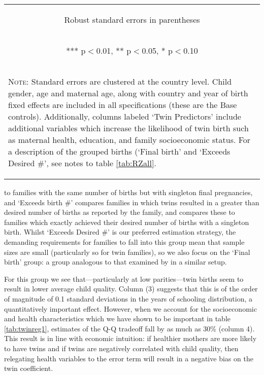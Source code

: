 \documentclass{article}[11pt,subeqn]
\begin{document}
\begin{spacing}{1.5}
\begin{sidewaystable}[!htbp]
\begin{center}
\begin{tabular}{lcccccc}
\\ \midrule													
\multicolumn{7}{c}{\begin{footnotesize} Robust standard errors in parentheses\end{footnotesize}} \\													
\multicolumn{7}{c}{\begin{footnotesize} *** p$<$0.01, ** p$<$0.05, * p$<$0.10 \end{footnotesize}} \\													
\bottomrule													
\multicolumn{7}{p{19cm}}{\setstretch{0.9}\begin{footnotesize}\textsc{Note:} Standard errors are clustered at the country level.  Child gender, age and maternal age, along with
country and year of birth fixed effects are included in all specifications (these are the Base controls). Additionally, columns labeled `Twin Predictors' include additional
variables which increase the likelihood of twin birth such as maternal health, education, and family socioeconomic status. For a description of the grouped births (`Final birth'
and `Exceeds Desired \#', see notes to table \ref{tab:RZall}. \end{footnotesize}}\\												
\end{tabular}													
\end{center}													
\end{sidewaystable}													

\noindent to families with the same number of births but with singleton final pregnancies, and `Exceeds birth \#' compares families in which 
twins resulted in a greater than desired number of births as reported by the family, and compares these to families which exactly achieved their desired number of births with 
a singleton birth.  Whilst `Exceeds Desired \#' is our preferred estimation strategy, the demanding requirements for families to fall into
this group mean that sample sizes are small (particularly so for twin families), so we also focus on the `Final birth' group: a group analogous to that examined by 
\citet{RosenzweigZhang2009} in a similar setup.  

For this group we see that---particularly at low parities---twin births seem to result in lower average child quality.  Column (3) suggests that
this is of the order of magnitude of 0.1 standard deviations in the years of schooling distribution, a quantitatively important effect.  However, when we account for the socioeconomic
and health characteristics which we have shown to be important in table \ref{tab:twinreg1}, estimates of the Q-Q tradeoff fall by as much as 30\%
(column 4).  This result is in line with economic intuition: if healthier mothers are more likely to have twins and if twins are negatively correlated
with child quality, then relegating health variables to the error term will result in a negative bias on the twin coefficient.


\end{spacing}
\end{document}
